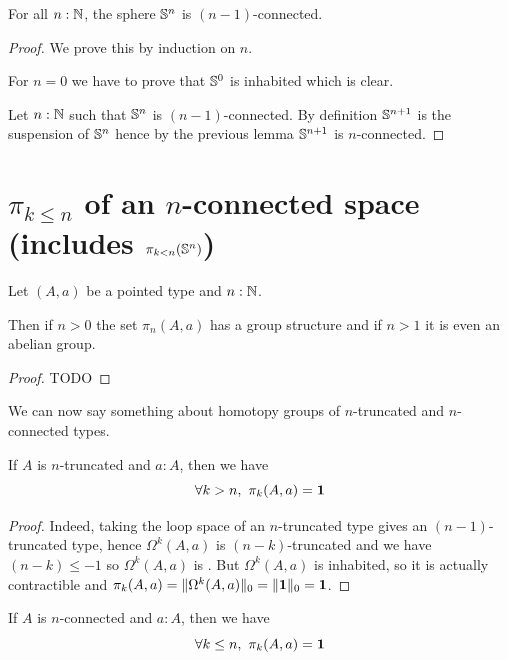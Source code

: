\begin{cor} \label{cor:sn-connected}
  For all $n:\N$, the sphere $\Sn^n$ is $(n-1)$-connected.
\end{cor}

\begin{proof}
  We prove this by induction on $n$.

  For $n=0$ we have to prove that $\Sn^0$ is inhabited which is clear.

  Let $n:\N$ such that $\Sn^n$ is $(n-1)$-connected. By definition $\Sn^{n+1}$
  is the suspension of $\Sn^n$ hence by the previous lemma $\Sn^{n+1}$ is
  $n$-connected.
\end{proof}

\section{\texorpdfstring{$\pi_{k \le n}$}{π\_(k≤n)} of an \texorpdfstring{$n$}{n}-connected space (includes \texorpdfstring{$\pi_{k < n}(\Sn ^n)$}{π\_(k<n)(Sⁿ)})}
\label{sec:pik-le-n}

\begin{lem}
  Let $(A,a)$ be a pointed type and $n:\N$.

  Then if $n>0$ the set $\pi_n(A,a)$ has a group structure and if $n>1$ it is
  even an abelian group.
\end{lem}

\begin{proof}
  TODO
\end{proof}

We can now say something about homotopy groups of $n$-truncated and
$n$-connected types.

\begin{lem}
  If $A$ is $n$-truncated and $a:A$, then we have
  \[\forall k>n,\ \pi_k(A,a)=\unit\]
\end{lem}

\begin{proof}
  Indeed, taking the loop space of an $n$-truncated type gives an
  $(n-1)$-truncated type, hence $\Omega^k(A,a)$ is $(n-k)$-truncated and we have
  $(n-k)\le-1$ so $\Omega^k(A,a)$ is \anhprop. But $\Omega^k(A,a)$ is inhabited,
  so it is actually contractible and
  $\pi_k(A,a)=\trunc0{\Omega^k(A,a)}=\trunc0{\unit}=\unit$.
\end{proof}

\begin{lem} \label{lem:pik-nconnected}
  If $A$ is $n$-connected and $a:A$, then we have
  \[\forall k\le{}n,\ \pi_k(A,a)=\unit\]
\end{lem}

